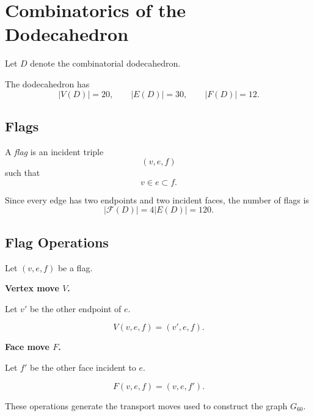 \section{Combinatorics of the Dodecahedron}
\label{sec:dodec}

Let $D$ denote the combinatorial dodecahedron.

The dodecahedron has
\[
|V(D)| = 20, \qquad |E(D)| = 30, \qquad |F(D)| = 12.
\]

\subsection{Flags}

A \emph{flag} is an incident triple
\[
(v,e,f)
\]
such that
\[
v \in e \subset f.
\]

Since every edge has two endpoints and two incident faces, the number
of flags is
\[
|\mathcal{F}(D)| = 4|E(D)| = 120.
\]

\subsection{Flag Operations}

Let $(v,e,f)$ be a flag.

\begin{definition}

\textbf{Vertex move $V$.}

Let $v'$ be the other endpoint of $e$.

\[
V(v,e,f) = (v',e,f).
\]

\textbf{Face move $F$.}

Let $f'$ be the other face incident to $e$.

\[
F(v,e,f) = (v,e,f').
\]

\end{definition}

These operations generate the transport moves used to construct the
graph $G_{60}$.
